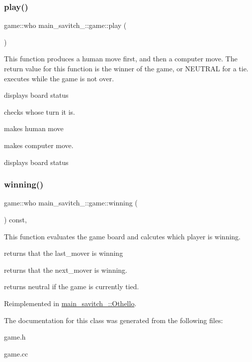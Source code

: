 \subsubsection{\texorpdfstring{play()}{play()}}
{\footnotesize\ttfamily game\+::who main\+\_\+savitch\+\_\+::game\+::play (\begin{DoxyParamCaption}{ }\end{DoxyParamCaption})}

This function produces a human move first, and then a computer move. The return value for this function is the winner of the game, or N\+E\+U\+T\+R\+AL for a tie. executes while the game is not over.

displays board status

checks whose turn it is.

makes human move

makes computer move.

displays board status \mbox{\label{classmain__savitch__14_1_1game_a2f0d5338c12bd98d52fe2383ece5c45e}} 
\subsubsection{\texorpdfstring{winning()}{winning()}}
{\footnotesize\ttfamily game\+::who main\+\_\+savitch\+\_\+::game\+::winning (\begin{DoxyParamCaption}{ }\end{DoxyParamCaption}) const\hspace{0.3cm}{\ttfamily [protected]}, {\ttfamily [virtual]}}



This function evaluates the game board and calcutes which player is winning. 

returns that the last\+\_\+mover is winning

returns that the next\+\_\+mover is winning.

returns neutral if the game is currently tied. 

Reimplemented in \mbox{\hyperlink{classmain__savitch__14_1_1_othello_a4ea78b18eea66c944c0a9356349e0fd4}{main\+\_\+savitch\+\_\+::\+Othello}}.



The documentation for this class was generated from the following files\+:\begin{DoxyCompactItemize}
\item 
game.\+h\item 
game.\+cc\end{DoxyCompactItemize}
